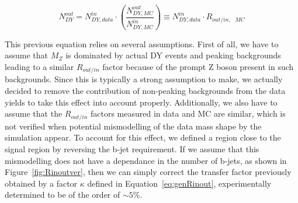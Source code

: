 \documentclass[a4paper, 10pt, openright]{report}
\begin{document}
\begin{equation}
\label{eq:Routin}
N^{out}_{DY} = N^{in}_{DY, data} \cdot \left (\frac{N^{out}_{DY, MC}}{N^{in}_{DY, MC}} \right ) \equiv  N^{in}_{DY, data} \cdot R_{out/in,\text{ } MC}
\end{equation}

This previous equation relies on several assumptions. First of all, we have to assume that $M_Z$ is dominated by actual \ac{DY} events and peaking backgrounds leading to a similar $R_{out/in}$ factor because of the prompt Z boson present in such backgrounds. Since this is typically a strong assumption to make, we actually decided to remove the contribution of non-peaking backgrounds from the data yields to take this effect into account properly. Additionally, we also have to assume that the $R_{out/in}$ factors measured in data and \ac{MC} are similar, which is not verified when potential mismodelling of the data mass shape by the simulation appear. To account for this effect, we defined a region close to the signal region by reversing the b-jet requirement. If we assume that this mismodelling does not have a dependance in the number of b-jets, as shown in Figure~\ref{fig:Rinoutver}, then we can simply correct the transfer factor previously obtained by a factor $\kappa$ defined in Equation~\ref{eq:genRinout}, experimentally determined to be of the order of $\sim 5\%$.%
\end{document}
